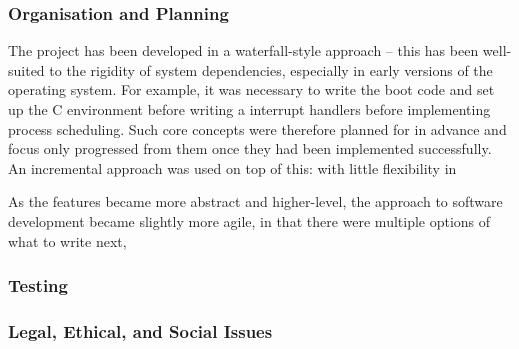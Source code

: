     \subsubsection{Organisation and Planning}
        The project has been developed in a waterfall-style approach -- this has
        been well-suited to the rigidity of system dependencies, especially in
        early versions of the operating system. For example, it was necessary to
        write the boot code and set up the C environment before writing a
        interrupt handlers before implementing process scheduling. Such core
        concepts were therefore planned for in advance and focus only progressed
        from them once they had been implemented successfully. An incremental
        approach was used on top of this: with little flexibility in 

        As the features
        became more abstract and higher-level, the approach to software
        development became slightly more agile, in that there were multiple
        options of what to write next, 

    \subsubsection{Testing}
    \subsubsection{Legal, Ethical, and Social Issues}
